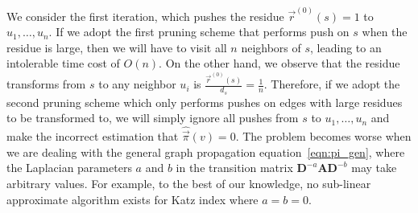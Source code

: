 We consider the first iteration, which pushes the residue $\vec{r}^{(0)}(s)=1$ to $u_1, \ldots, u_n$. If we adopt the first pruning scheme that performs push on $s$ when the residue is large, then we will have to visit all $n$ neighbors of $s$, leading to an intolerable time cost of $O(n)$. On the other hand, we observe that the residue transforms from $s$ to any neighbor $u_i$ is $ \frac{\vec{r}^{(0)}(s)}{d_s} = \frac{1}{n}$. Therefore, if we adopt the second pruning scheme which only performs pushes on edges with large residues to be transformed to, we will simply ignore all pushes from $s$ to $u_1, \ldots, u_n$ and make the incorrect estimation that $\hat{\vec{\pi}}(v)=0$. The problem becomes worse when we are dealing with the general graph propagation equation~\eqref{eqn:pi_gen}, where the Laplacian parameters $a$ and $b$ in the transition matrix $\mathbf{D}^{-a} \mathbf{A}  \mathbf{D}^{-b}$ may take arbitrary values. For example, to the best of our knowledge, no sub-linear approximate algorithm exists for Katz index where $a=b=0$.









